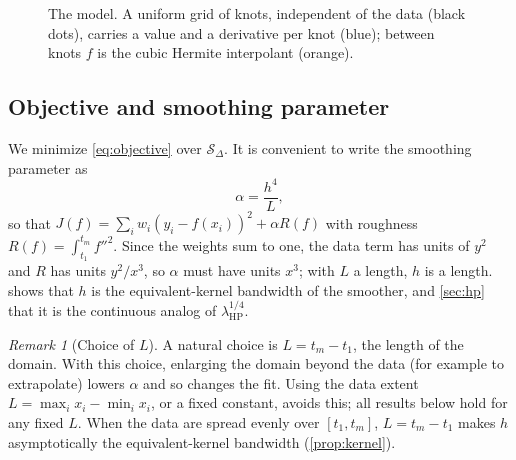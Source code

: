 \documentclass[11pt,a4paper]{article}
\theoremstyle{definition}
\theoremstyle{remark}
\newtheorem{remark}[theorem]{Remark}
\newcommand{\Sd}{\mathcal{S}_\Delta}
\begin{document}
\begin{figure}[t]
\centering
{}
\caption{The model. A uniform grid of knots, independent of the data (black dots), carries a value and a derivative per knot (blue); between knots $f$ is the cubic Hermite interpolant (orange).}
\label{fig:concept}
\end{figure}

\subsection{Objective and smoothing parameter}

We minimize \eqref{eq:objective} over $\Sd$. It is convenient to write the smoothing parameter as
\begin{equation}
\label{eq:alpha}
\alpha=\frac{h^4}{L},
\end{equation}
so that $J(f)=\sum_i w_i(y_i-f(x_i))^2+\alpha R(f)$ with roughness $R(f)=\int_{t_1}^{t_m}f''^2$. Since the weights sum to one, the data term has units of $y^2$ and $R$ has units $y^2/x^3$, so $\alpha$ must have units $x^3$; with $L$ a length, $h$ is a length.  shows that $h$ is the equivalent-kernel bandwidth of the smoother, and \cref{sec:hp} that it is the continuous analog of $\lambda_{\mathrm{HP}}^{1/4}$.

\begin{remark}[Choice of $L$]
\label{rem:L}
A natural choice is $L=t_m-t_1$, the length of the domain. With this choice, enlarging the domain beyond the data (for example to extrapolate) lowers $\alpha$ and so changes the fit. Using the data extent $L=\max_i x_i-\min_i x_i$, or a fixed constant, avoids this; all results below hold for any fixed $L$. When the data are spread evenly over $[t_1,t_m]$, $L=t_m-t_1$ makes $h$ asymptotically the equivalent-kernel bandwidth (\cref{prop:kernel}).
\end{remark}
\end{document}
